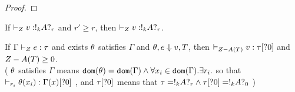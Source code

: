 \begin{proof}

  


  \end{proof} 

\begin{thm}
  If $ \empty  \tvdash{\nnatA} \valr : \bang{k} \ltype \whynot{r}$ and
  $r' \geq r$, 
  then $ \empty  \tvdash{\nnatA} \valr : \bang{k} \ltype \whynot{r}$.
\end{thm}%




\begin{thm}
  If $ \Gamma  \vdash_{Z} e : \tau$
  and  exists $\theta $ satisfies $\Gamma$  and  $\theta, e \mathrel{\Downarrow} v, T $,
  then $ \empty  \tvdash{\nnatA- A(\tr)} \valr : \type[?0]$ and
  $Z- A(T) \geq 0 $. \\(
  $\theta$ satisfies $\Gamma$ means $\mathtt{dom}(\theta) = \mathtt{dom}(\Gamma) \land
  \forall x_i \in \mathtt{dom}(\Gamma).  \exists r_i.$ so that $\empty
  \tvdash{r_i} \env(x_i) : \Gamma(x)[?0] $ , and $\tau[?0] $ means that $
  \tau = !_{k}A ?_{r} \land \tau[?0]= !_{k}A ?_{0}$ )
\end{thm}%


